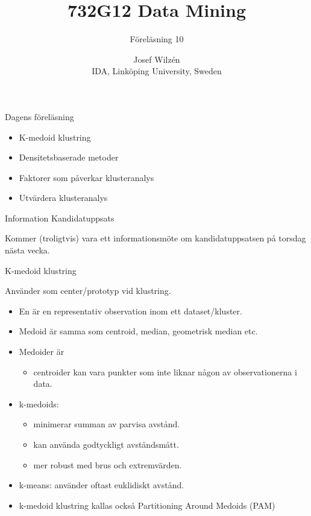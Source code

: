 \documentclass[10pt,english]{beamer}
\title{732G12 Data Mining}
\subtitle{Föreläsning 10}
\date{}
\author{Josef Wilzén \\ IDA, Linköping University, Sweden}
\begin{document}
\maketitle

\begin{frame}{Dagens föreläsning}

    \begin{itemize}
        \item K-medoid klustring
        \item Densitetsbaserade metoder
        \item Faktorer som påverkar klusteranalys
        \item Utvärdera klusteranalys
    \end{itemize}
    
\end{frame}

\begin{frame}{Information Kandidatuppsats}
    
    Kommer (troligtvis) vara ett informationsmöte om kandidatuppsatsen på torsdag nästa vecka. 

\end{frame}

\begin{frame}{K-medoid klustring}

    Använder  som center/prototyp vid klustring.
    \begin{itemize}
        \item En  är en representativ observation inom ett dataset/kluster.
        \item Medoid är  samma som centroid, median, geometrisk median etc.
        \item Medoider är 
        \begin{itemize}
            \item centroider kan vara punkter som inte liknar någon av observationerna i data.
        \end{itemize}
        \item k-medoids:
        \begin{itemize}
            \item minimerar summan av parvisa avstånd.
            \item kan använda godtyckligt avståndsmått.
            \item mer robust med brus och extremvärden.
        \end{itemize}
        \item k-means: använder oftast euklidiskt avstånd.
        \item k-medoid klustring kallas också Partitioning Around Medoids (PAM)
    \end{itemize}
    
\end{frame}
\end{document}
